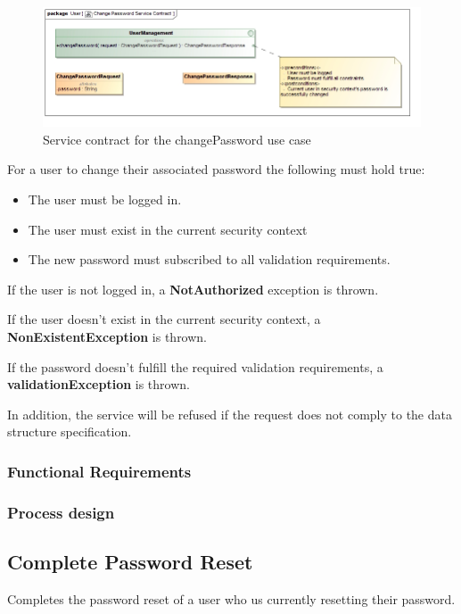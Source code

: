 \begin{figure}[H]
  \begin{center}
  \includegraphics[scale=0.55]{../Diagrams and Charts/Users/Change Password Service Contract.jpg}
  \caption{Service contract for the changePassword use case}
  \label{fig:changePasswordServicesContract}
  \end{center}
\end{figure}

For a user to change their associated password the following must hold true:
\begin{itemize}
	\item The user must be logged in.
	\item The user must exist in the current security context
	\item The new password must subscribed to all validation requirements.
\end{itemize}

If the user is not logged in, a \textbf{NotAuthorized} exception is thrown.

If the user doesn't exist in the current security context, a \textbf{NonExistentException} is thrown.

If the password doesn't fulfill the required validation requirements, a \textbf{validationException} is thrown.

In addition, the service will be refused if the request does not comply to the data structure specification.

\subsubsection{Functional Requirements}

\subsubsection{Process design}

\subsection{Complete Password Reset}
Completes the password reset of a user who us currently resetting their password.

